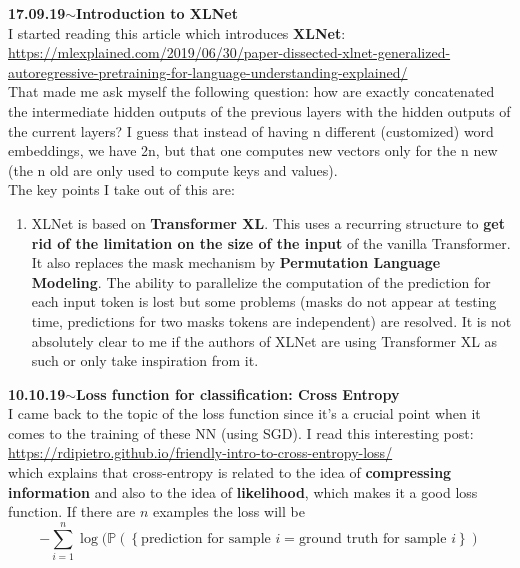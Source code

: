 \documentclass[11pt,a4paper]{article}
\newenvironment{loggentry}[2]%
{\noindent\textbf{#1}\hspace{1cm}$\mathbf{\sim}$\text{ }\textbf{#2}\\}{\vspace{0.5cm}}
\begin{document}
\begin{loggentry}{17.09.19}{Introduction to XLNet}

I started reading this article which introduces \textbf{XLNet}:\\
\url{https://mlexplained.com/2019/06/30/paper-dissected-xlnet-generalized-autoregressive-pretraining-for-language-understanding-explained/}\\
That made me ask myself the following question: how are exactly concatenated the intermediate hidden outputs of the previous layers with the hidden outputs of the current layers? I guess that instead of having n different (customized) word embeddings, we have 2n, but that one computes new vectors only for the n new (the n old are only used to compute keys and values).\\
The key points I take out of this are:
\begin{enumerate}
\item XLNet is based on \textbf{Transformer XL}. This uses a recurring structure to \textbf{get rid of the limitation on the size of the input} of the vanilla Transformer. It also replaces the mask mechanism by \textbf{Permutation Language Modeling}. The ability to parallelize the computation of the prediction for each input token is lost but some problems (masks do not appear at testing time, predictions for two masks tokens are independent) are resolved. It is not absolutely clear to me if the authors of XLNet are using Transformer XL as such or only take inspiration from it.
\end{enumerate}

\end{loggentry}


\begin{loggentry}{10.10.19}{Loss function for classification: Cross Entropy}

I came back to the topic of the loss function since it's a crucial point when it comes to the training of these NN (using SGD). I read this interesting post:\\
\url{https://rdipietro.github.io/friendly-intro-to-cross-entropy-loss/}\\
which explains that cross-entropy is related to the idea of \textbf{compressing information} and also to the idea of \textbf{likelihood}, which makes it a good loss function. If there are $n$ examples the loss will be
$$
-\sum_{i=1}^n\log (\mathbb{P}\left( \left\lbrace \text{prediction for sample }i =\text{ground truth for sample }i\right\rbrace \right)
$$

\end{loggentry}
\end{document}
